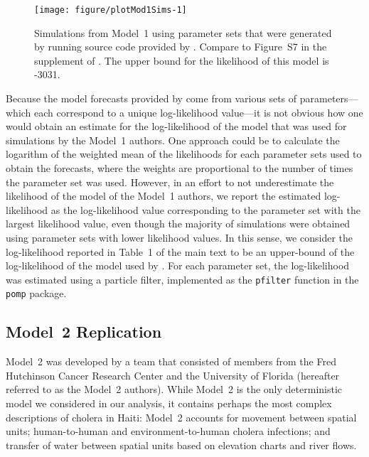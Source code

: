 \begin{figure}[!h]
\begin{knitrout}
\color{fgcolor}
\texttt{[image: figure/plotMod1Sims-1]} 
\end{knitrout}
\caption[Simulations from replicated Model 1]{\label{fig:plotMod1Sims}
Simulations from Model~1 using parameter sets that were generated by running source code provided by \citet{lee20}. Compare to Figure~S7 in the supplement of \citet{lee20}. The upper bound for the likelihood of this model is -3031.
}
\end{figure}

Because the model forecasts provided by \citet{lee20} come from various sets of parameters---which each correspond to a unique log-likelihood value---it is not obvious how one would obtain an estimate for the log-likelihood of the model that was used for simulations by the Model~1 authors.
One approach could be to calculate the logarithm of the weighted mean of the likelihoods for each parameter sets used to obtain the forecasts, where the weights are proportional to the number of times the parameter set was used.
However, in an effort to not underestimate the likelihood of the model of the Model~1 authors, we report the estimated log-likelihood as the log-likelihood value corresponding to the parameter set with the largest likelihood value, even though the majority of simulations were obtained using parameter sets with lower likelihood values.
In this sense, we consider the log-likelihood reported in Table~1 of the main text to be an upper-bound of the log-likelihood of the model used by \citet{lee20}.
For each parameter set, the log-likelihood was estimated using a particle filter, implemented as the \texttt{pfilter} function in the \texttt{pomp} package.

\subsection{Model~2 Replication}\label{sec:mod2rep}

Model~2 was developed by a team that consisted of members from the Fred Hutchinson Cancer Research Center and the University of Florida (hereafter referred to as the Model~2 authors).
While Model~2 is the only deterministic model we considered in our analysis, it contains perhaps the most complex descriptions of cholera in Haiti: Model~2 accounts for movement between spatial units; human-to-human and environment-to-human cholera infections; and transfer of water between spatial units based on elevation charts and river flows.

